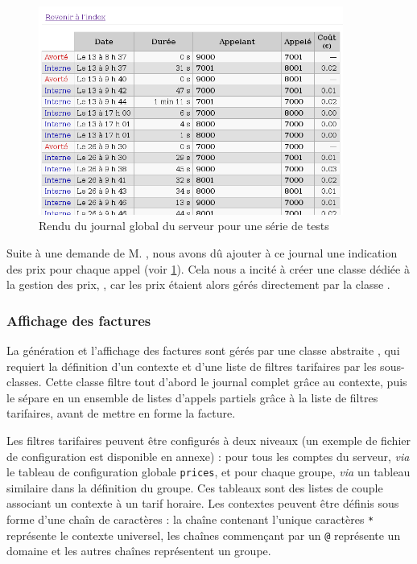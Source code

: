 \begin{figure}
\begin{center}
\includegraphics[width=10cm]{images/journal-global.png}
\end{center}
\label{imgjournal}
\caption{Rendu du journal global du serveur pour une série de tests}
\end{figure}

Suite à une demande de M. , nous avons dû ajouter à ce journal une indication des prix pour chaque appel (voir \cref{imgjournal}). Cela nous a incité à créer une classe dédiée à la gestion des prix, , car les prix étaient alors gérés directement par la classe .

\subsubsection{Affichage des factures}

La génération et l’affichage des factures sont gérés par une classe abstraite , qui requiert la définition d’un contexte et d’une liste de filtres tarifaires par les sous-classes. Cette classe filtre tout d’abord le journal complet grâce au contexte, puis le sépare en un ensemble de listes d’appels partiels grâce à la liste de filtres tarifaires, avant de mettre en forme la facture.

Les filtres tarifaires peuvent être configurés à deux niveaux (un exemple de fichier de configuration est disponible en annexe) : pour tous les comptes du serveur, \textit{via} le tableau de configuration globale \texttt{prices}, et pour chaque groupe, \textit{via} un tableau similaire dans la définition du groupe. Ces tableaux sont des listes de couple associant un contexte à un tarif horaire. Les contextes peuvent être définis sous forme d’une chaîn de caractères : la chaîne contenant l’unique caractères \texttt{*} représente le contexte universel, les chaînes commençant par un \texttt{@} représente un domaine et les autres chaînes représentent un groupe.

